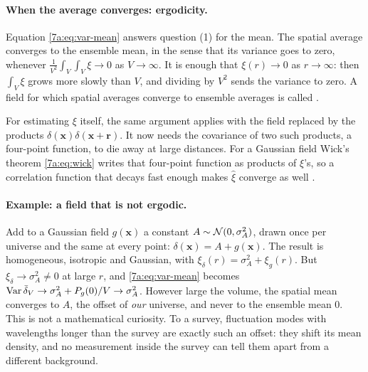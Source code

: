 \paragraph{When the average converges: ergodicity.}
Equation \eqref{7a:eq:var-mean} answers question (1) for the mean. The spatial
average converges to the ensemble mean, in the sense that its variance goes to
zero, whenever $\frac{1}{V^2}\int_V\int_V\xi\to0$ as $V\to\infty$. It is enough
that $\xi(r)\to0$ as $r\to\infty$: then $\int_V\xi$ grows more slowly than $V$,
and dividing by $V^2$ sends the variance to zero. A field for which spatial
averages converge to ensemble averages is called .

For estimating $\xi$ itself, the same argument applies with the field replaced by
the products $\delta(\bm x)\delta(\bm x+\bm r)$. It now needs the covariance of
two such products, a four-point function, to die away at large distances. For a
Gaussian field Wick's theorem \eqref{7a:eq:wick} writes that four-point function
as products of $\xi$'s, so a correlation function that decays fast enough makes
$\hat\xi$ converge as well \cite{Peacock1999}.

\paragraph{Example: a field that is not ergodic.}
Add to a Gaussian field $g(\bm x)$ a constant $A\sim\mathcal{N}(0,\sigma_A^2)$, drawn
once per universe and the same at every point: $\delta(\bm x)=A+g(\bm x)$. The
result is homogeneous, isotropic and Gaussian, with
$\xi_\delta(r)=\sigma_A^2+\xi_g(r)$. But $\xi_\delta\to\sigma_A^2\neq0$ at large $r$,
and \eqref{7a:eq:var-mean} becomes
$\operatorname{Var}\bar\delta_V\to\sigma_A^2+P_g(0)/V\to\sigma_A^2$. However large the volume,
the spatial mean converges to $A$, the offset of \emph{our} universe, and never to
the ensemble mean $0$. This is not a mathematical curiosity. To a survey,
fluctuation modes with wavelengths longer than the survey are exactly such an
offset: they shift its mean density, and no measurement inside the survey can
tell them apart from a different background.

